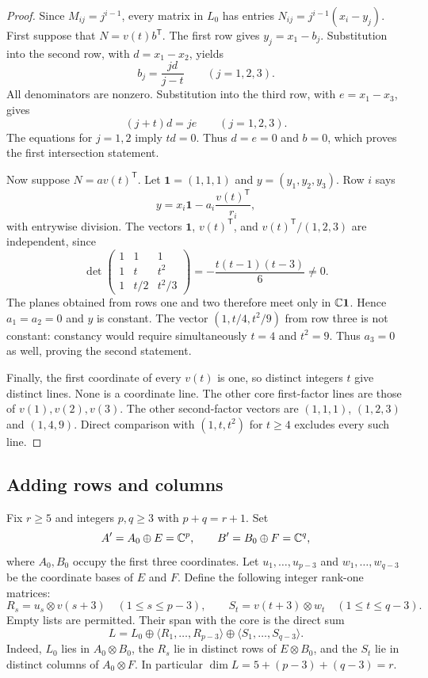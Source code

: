 \begin{proof}
Since $M_{ij}=j^{i-1}$, every matrix in $L_0$ has entries
$N_{ij}=j^{i-1}(x_i-y_j)$. First suppose that $N=v(t)b^{\mathsf T}$.
The first row gives $y_j=x_1-b_j$. Substitution into the second row,
with $d=x_1-x_2$, yields
\[
 b_j=\frac{jd}{j-t}\qquad(j=1,2,3).
\]
All denominators are nonzero. Substitution into the third row, with
$e=x_1-x_3$, gives
\[
 (j+t)d=je\qquad(j=1,2,3).
\]
The equations for $j=1,2$ imply $td=0$. Thus $d=e=0$ and $b=0$,
which proves the first intersection statement.

Now suppose $N=a v(t)^{\mathsf T}$. Let
$\mathbf 1=(1,1,1)$ and $y=(y_1,y_2,y_3)$. Row $i$ says
\[
 y=x_i\mathbf1-a_i\frac{v(t)^{\mathsf T}}{r_i},
\]
with entrywise division. The vectors $\mathbf1$, $v(t)^{\mathsf T}$,
and $v(t)^{\mathsf T}/(1,2,3)$ are independent, since
\begin{equation}\label{eq:avoidance-determinant}
 \det\begin{pmatrix}
 1&1&1\\1&t&t^2\\1&t/2&t^2/3
 \end{pmatrix}
 =-\frac{t(t-1)(t-3)}6\ne0.
\end{equation}
The planes obtained from rows one and two therefore meet only in
$\mathbb C\mathbf1$. Hence $a_1=a_2=0$ and $y$ is constant.
The vector $(1,t/4,t^2/9)$ from row three is not constant: constancy
would require simultaneously $t=4$ and $t^2=9$. Thus $a_3=0$ as well,
proving the second statement.

Finally, the first coordinate of every $v(t)$ is one, so distinct
integers $t$ give distinct lines. None is a coordinate line.
The other core first-factor lines are those of
$v(1),v(2),v(3)$. The other second-factor vectors are
$(1,1,1)$, $(1,2,3)$ and $(1,4,9)$. Direct comparison with
$(1,t,t^2)$ for $t\geq4$ excludes every such line.
\end{proof}

\subsection{Adding rows and columns}

Fix $r\geq5$ and integers $p,q\geq3$ with $p+q=r+1$. Set
\[
 A'=A_0\oplus E=\mathbb C^p,\qquad B'=B_0\oplus F=\mathbb C^q,
\]
where $A_0,B_0$ occupy the first three coordinates. Let
$u_1,\ldots,u_{p-3}$ and $w_1,\ldots,w_{q-3}$ be the coordinate bases
of $E$ and $F$. Define the following integer rank-one matrices:
\begin{equation}\label{eq:added-matrices}
 R_s=u_s\otimes v(s+3)\quad(1\leq s\leq p-3),\qquad
 S_t=v(t+3)\otimes w_t\quad(1\leq t\leq q-3).
\end{equation}
Empty lists are permitted. Their span with the core is the direct sum
\begin{equation}\label{eq:extended-L}
 L=L_0\oplus\langle R_1,\ldots,R_{p-3}\rangle
       \oplus\langle S_1,\ldots,S_{q-3}\rangle.
\end{equation}
Indeed, $L_0$ lies in $A_0\otimes B_0$, the $R_s$ lie in distinct
rows of $E\otimes B_0$, and the $S_t$ lie in distinct columns of
$A_0\otimes F$. In particular $\dim L=5+(p-3)+(q-3)=r$.

